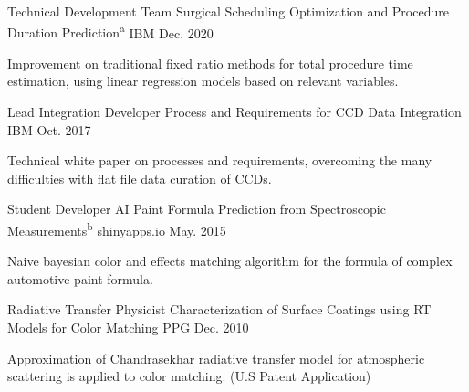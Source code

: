 

\begin{cventries}

  \cvpublication
    {Technical Development Team} %
    {Surgical Scheduling Optimization and Procedure Duration Prediction\textsuperscript{a}} %
    {IBM} %
    {Dec. 2020} %
    {
      \begin{cvcompactparagraph}
        Improvement on traditional fixed ratio methods for total procedure time estimation, using linear regression models based on relevant variables.
      \end{cvcompactparagraph}
    }

  \cvpublication
    {Lead Integration Developer} %
    {Process and Requirements for CCD Data Integration} %
    {IBM} %
    {Oct. 2017} %
    {
      \begin{cvcompactparagraph}
        Technical white paper on processes and requirements, overcoming the many difficulties with flat file data curation of CCDs.
      \end{cvcompactparagraph}
    }

  \cvpublication
    {Student Developer} %
    {AI Paint Formula Prediction from Spectroscopic Measurements\textsuperscript{b}} %
    {shinyapps.io} %
    {May. 2015} %
    {
      \begin{cvcompactparagraph}
        Naive bayesian color and effects matching algorithm for the formula of complex automotive paint formula.
      \end{cvcompactparagraph}
    }

  \cvpublication
    {Radiative Transfer Physicist} %
    {Characterization of Surface Coatings using RT Models for Color Matching} %
    {PPG} %
    {Dec. 2010} %
    {
      \begin{cvcompactparagraph}
        Approximation of Chandrasekhar radiative transfer model for atmospheric scattering is applied to color matching.  (U.S Patent Application)
      \end{cvcompactparagraph}
    }


\end{cventries}
